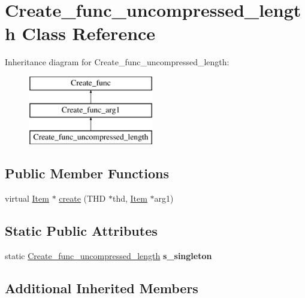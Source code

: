\hypertarget{classCreate__func__uncompressed__length}{}\section{Create\+\_\+func\+\_\+uncompressed\+\_\+length Class Reference}
\label{classCreate__func__uncompressed__length}
Inheritance diagram for Create\+\_\+func\+\_\+uncompressed\+\_\+length\+:\begin{figure}[H]
\begin{center}
\leavevmode
\includegraphics[height=3.000000cm]{classCreate__func__uncompressed__length}
\end{center}
\end{figure}
\subsection*{Public Member Functions}
\begin{DoxyCompactItemize}
\item 
virtual \mbox{\hyperlink{classItem}{Item}} $\ast$ \mbox{\hyperlink{classCreate__func__uncompressed__length_a600d8a722729d4d8859207c831eba61b}{create}} (T\+HD $\ast$thd, \mbox{\hyperlink{classItem}{Item}} $\ast$arg1)
\end{DoxyCompactItemize}
\subsection*{Static Public Attributes}
\begin{DoxyCompactItemize}
\item 
\mbox{\label{classCreate__func__uncompressed__length_abcb8627cb5eb99246cc4e55eb330fb3a}} 
static \mbox{\hyperlink{classCreate__func__uncompressed__length}{Create\+\_\+func\+\_\+uncompressed\+\_\+length}} {\bfseries s\+\_\+singleton}
\end{DoxyCompactItemize}
\subsection*{Additional Inherited Members}


